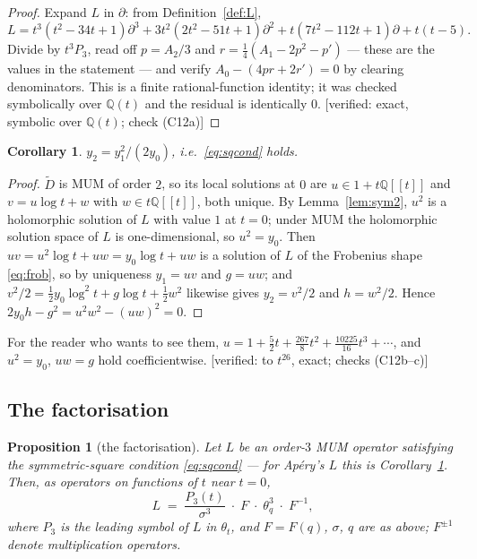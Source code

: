 \documentclass[11pt,reqno]{amsart}
\theoremstyle{plain}
\newtheorem{proposition}[theorem]{Proposition}
\newtheorem{corollary}[theorem]{Corollary}
\theoremstyle{definition}
\theoremstyle{remark}
\newcommand{\Q}{\mathbb{Q}}
\newcommand{\Ver}[1]{\textup{\textsf{[verified: #1]}}}
\newcommand{\ta}{\theta_t}
\newcommand{\tq}{\theta_q}
\numberwithin{equation}{section}
\begin{document}
\begin{proof}
Expand $L$ in $\partial$: from Definition~\ref{def:L},
\[
  L=t^3(t^2-34t+1)\partial^3+3t^2(2t^2-51t+1)\partial^2
    +t(7t^2-112t+1)\partial+t(t-5).
\]
Divide by $t^3P_3$, read off $p=A_2/3$ and $r=\tfrac14(A_1-2p^2-p')$ --- these
are the values in the statement --- and verify $A_0-(4pr+2r')=0$ by clearing
denominators. This is a finite rational-function identity; it was checked
symbolically over $\Q(t)$ and the residual is identically $0$.
\Ver{exact, symbolic over $\Q(t)$; check \textup{(C12a)}}
\end{proof}

\begin{corollary}\label{cor:sq}
$y_2=y_1^2/(2y_0)$, i.e.\ \eqref{eq:sqcond} holds.
\end{corollary}

\begin{proof}
$\widetilde D$ is MUM of order $2$, so its local solutions at $0$ are
$u\in1+t\Q[[t]]$ and $v=u\log t+w$ with $w\in t\Q[[t]]$, both unique. By
Lemma~\ref{lem:sym2}, $u^2$ is a holomorphic solution of $L$ with value $1$ at
$t=0$; under MUM the holomorphic solution space of $L$ is one-dimensional, so
$u^2=y_0$. Then $uv=u^2\log t+uw=y_0\log t+uw$ is a solution of $L$ of the
Frobenius shape \eqref{eq:frob}, so by uniqueness $y_1=uv$ and $g=uw$;
and $v^2/2=\tfrac12y_0\log^2t+g\log t+\tfrac12w^2$ likewise gives $y_2=v^2/2$
and $h=w^2/2$. Hence $2y_0h-g^2=u^2w^2-(uw)^2=0$.
\end{proof}

\noindent For the reader who wants to see them,
$u=1+\tfrac52t+\tfrac{267}{8}t^2+\tfrac{10225}{16}t^3+\cdots$, and
$u^2=y_0$, $uw=g$ hold coefficientwise. \Ver{to $t^{26}$, exact; checks
\textup{(C12b--c)}}

\subsection*{The factorisation}

\begin{proposition}[the factorisation]\label{prop:factor}
Let $L$ be an order-$3$ MUM operator satisfying the symmetric-square condition
\eqref{eq:sqcond} --- for Ap\'ery's $L$ this is Corollary~\ref{cor:sq}. Then,
as operators on functions of $t$ near $t=0$,
\begin{equation}\label{eq:factor}
  L\;=\;\frac{P_3(t)}{\sigma^{3}}\;\cdot\;F\;\cdot\;\tq^{3}\;\cdot\;F^{-1},
\end{equation}
where $P_3$ is the leading symbol of $L$ in $\ta$, and $F=F(q)$, $\sigma$, $q$
are as above; $F^{\pm1}$ denote multiplication operators.
\end{proposition}
\end{document}
